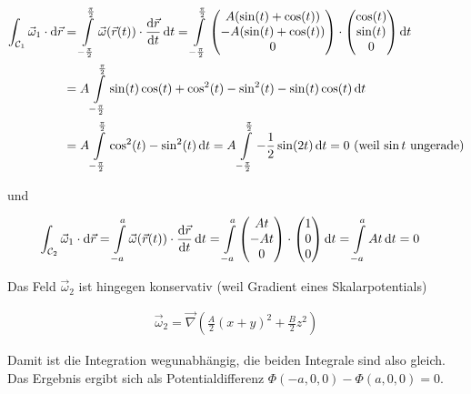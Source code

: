 \documentclass[a4paper,german,12pt,smallheadings]{scrartcl}
\begin{document}
\begin{align*}
  \int_{\mathcal{C}_1} \vec{\omega}_1 \cdot \dif\vec{r}
  &= \int\limits_{-\frac{\pi}{2}}^{\frac{\pi}{2}} \vec{\omega}(\vec{r}(t)) \cdot \frac{\dif\vec{r}}{\dif t} \dif t
  = \int\limits_{-\frac{\pi}{2}}^{\frac{\pi}{2}} \begin{pmatrix} A(\sin(t) + \cos(t)) \\ -A(\sin(t) + \cos(t)) \\ 0 \end{pmatrix} \cdot \begin{pmatrix} \cos(t) \\ \sin(t) \\ 0 \end{pmatrix} \dif t \\
  &= A \int\limits_{-\frac{\pi}{2}}^{\frac{\pi}{2}} \sin(t)\cos(t) + \cos^2(t) - \sin^2(t) - \sin(t)\cos(t) \dif t \\
  &= A \int\limits_{-\frac{\pi}{2}}^{\frac{\pi}{2}} \cos^2(t) - \sin^2(t) \dif t
   = A \int\limits_{-\frac{\pi}{2}}^{\frac{\pi}{2}} -\frac{1}{2} \sin(2t) \dif t
   = 0 \text{ (weil $\sin t$ ungerade)}
\end{align*}

und

\begin{align*}
  \int_{\mathcal{C}_2} \vec{\omega}_1 \cdot \dif\vec{r}
  &= \int\limits_{-a}^{a} \vec{\omega}(\vec{r}(t)) \cdot \frac{\dif\vec{r}}{\dif t} \dif t
  = \int\limits_{-a}^{a} \begin{pmatrix} At \\ -At \\ 0  \end{pmatrix} \cdot \begin{pmatrix} 1 \\ 0 \\ 0\end{pmatrix} \dif t
  = \int\limits_{-a}^{a} At \dif t = 0
\end{align*}

Das Feld $\vec{\omega}_2$ ist hingegen konservativ (weil Gradient eines Skalarpotentials)

\begin{align*}
  \vec{\omega}_2 = \vec{\nabla} \left( \frac{A}{2} (x+y)^2 + \frac{B}{2} z^2 \right)
\end{align*}

Damit ist die Integration wegunabhängig, die beiden Integrale sind also gleich.
Das Ergebnis ergibt sich als Potentialdifferenz $\Phi(-a, 0, 0) - \Phi(a, 0, 0)
= 0$.
\end{document}
